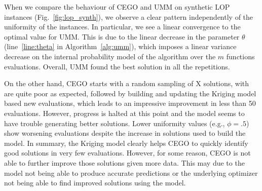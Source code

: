 \documentclass[runningheads]{llncs}
\begin{document}
When we compare the behaviour of CEGO and UMM on synthetic LOP instances
(Fig.~\ref{fig:lop_synth}), we observe a clear pattern independently of the
uniformity of the instances. In particular, we see a linear convergence to the optimal value for UMM. This is due to the linear decrease in the parameter $\theta$ (line~\ref{line:theta} in Algorithm~\ref{alg:umm}), which imposes a linear variance decrease on the internal probability model of the algorithm over the $m$ functions evaluations. Overall, UMM found the best solution in all the repetitions. 




On the other hand, 
CEGO starts with a random sampling
of X solutions, with are quite poor as expected, followed by building and
updating the Kriging model based new evaluations, which leads to an impressive
improvement in less than 50 evaluations. However, progress is %
halted at this point and the model seems to have trouble generating better
solutions. Lower uniformity values (e.g., $\phi=.5$) show worsening evaluations
despite the increase in solutions used to build the model. In summary, the
Kriging model clearly helps CEGO to quickly identify good solutions in very few
evaluations. However, for some reason, CEGO is not able to further improve
those solutions given more data. This may due to the model not being able to
produce accurate predictions or the underlying optimizer not being able to find
improved solutions using the model.





\newcommand{\supplement}{\citep{Supplementary}}
\end{document}
